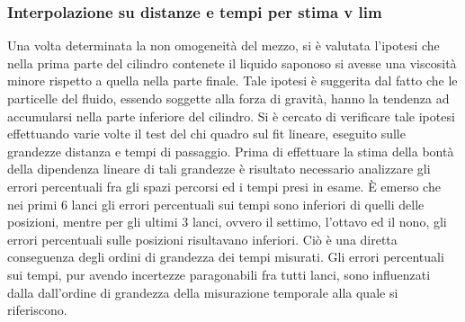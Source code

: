 \documentclass[a4paper,11pt,oneside]{article}
\begin{document}
\subsubsection*{Interpolazione su distanze e tempi per stima v lim}
Una volta determinata la non omogeneità del mezzo, si è valutata l'ipotesi che nella prima parte del cilindro contenete il liquido saponoso si avesse una viscosità minore rispetto a quella nella parte finale. Tale ipotesi è suggerita dal fatto che le particelle del fluido, essendo soggette alla forza di gravità, hanno la tendenza ad accumularsi nella parte inferiore del cilindro.\newline
Si è cercato di verificare tale ipotesi effettuando varie volte il test del chi quadro sul fit lineare, eseguito sulle grandezze distanza e tempi di passaggio.
Prima di effettuare la stima della bontà della dipendenza lineare di tali grandezze è risultato necessario analizzare gli errori percentuali fra gli spazi percorsi ed i tempi presi in esame. È emerso che nei primi 6 lanci gli errori percentuali sui tempi sono inferiori di quelli delle posizioni, mentre per gli ultimi 3 lanci, ovvero il settimo, l'ottavo ed il nono, gli errori percentuali sulle posizioni risultavano inferiori. Ciò è una diretta conseguenza degli ordini di grandezza dei tempi misurati. Gli errori percentuali sui tempi, pur avendo incertezze paragonabili fra tutti lanci, sono influenzati dalla dall'ordine di grandezza della misurazione temporale alla quale si riferiscono.


\end{document}
